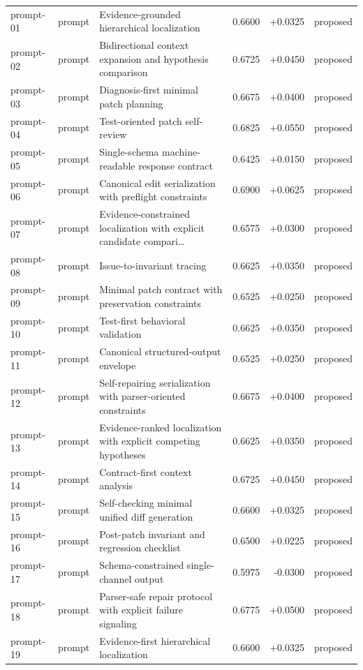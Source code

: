 \begin{center}
\begin{longtable}{llp{5.2cm}rrl}
prompt-01 & prompt & Evidence-grounded hierarchical localization & 0.6600 & +0.0325 & proposed \\
prompt-02 & prompt & Bidirectional context expansion and hypothesis comparison & 0.6725 & +0.0450 & proposed \\
prompt-03 & prompt & Diagnosis-first minimal patch planning & 0.6675 & +0.0400 & proposed \\
prompt-04 & prompt & Test-oriented patch self-review & 0.6825 & +0.0550 & proposed \\
prompt-05 & prompt & Single-schema machine-readable response contract & 0.6425 & +0.0150 & proposed \\
prompt-06 & prompt & Canonical edit serialization with preflight constraints & 0.6900 & +0.0625 & proposed \\
prompt-07 & prompt & Evidence-constrained localization with explicit candidate compari\ldots{} & 0.6575 & +0.0300 & proposed \\
prompt-08 & prompt & Issue-to-invariant tracing & 0.6625 & +0.0350 & proposed \\
prompt-09 & prompt & Minimal patch contract with preservation constraints & 0.6525 & +0.0250 & proposed \\
prompt-10 & prompt & Test-first behavioral validation & 0.6625 & +0.0350 & proposed \\
prompt-11 & prompt & Canonical structured-output envelope & 0.6525 & +0.0250 & proposed \\
prompt-12 & prompt & Self-repairing serialization with parser-oriented constraints & 0.6675 & +0.0400 & proposed \\
prompt-13 & prompt & Evidence-ranked localization with explicit competing hypotheses & 0.6625 & +0.0350 & proposed \\
prompt-14 & prompt & Contract-first context analysis & 0.6725 & +0.0450 & proposed \\
prompt-15 & prompt & Self-checking minimal unified diff generation & 0.6600 & +0.0325 & proposed \\
prompt-16 & prompt & Post-patch invariant and regression checklist & 0.6500 & +0.0225 & proposed \\
prompt-17 & prompt & Schema-constrained single-channel output & 0.5975 & -0.0300 & proposed \\
prompt-18 & prompt & Parser-safe repair protocol with explicit failure signaling & 0.6775 & +0.0500 & proposed \\
prompt-19 & prompt & Evidence-first hierarchical localization & 0.6600 & +0.0325 & proposed \\

\end{longtable}
\end{center}
